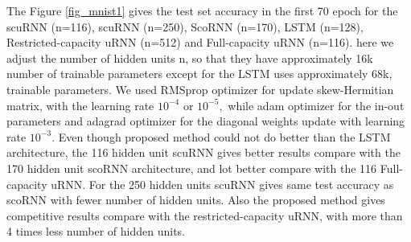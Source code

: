 \documentclass[letterpaper]{article} %
\begin{document}
\noindent The Figure \ref{fig_mnist1} gives the test set accuracy in the first 70 epoch for the scuRNN (n=116), scuRNN (n=250), ScoRNN (n=170), LSTM (n=128), Restricted-capacity uRNN (n=512) and Full-capacity uRNN (n=116). here we adjust the number of hidden units n, so that they have approximately 16k number of trainable parameters except for the LSTM uses approximately 68k, trainable parameters. We used RMSprop optimizer for update skew-Hermitian matrix, with the learning rate $10^{-4}$ or $10^{-5},$ while adam optimizer for the in-out parameters and adagrad optimizer for the diagonal weights update with learning rate $10^{-3}$. Even though proposed method could not do better than the LSTM architecture, the 116 hidden unit scuRNN gives better results compare with the 170 hidden unit scoRNN architecture, and lot better compare with the 116 Full-capacity uRNN. For the 250 hidden units scuRNN gives same test accuracy as scoRNN with fewer number of hidden units. Also the proposed method gives competitive results compare with the restricted-capacity uRNN, with more than 4 times less number of hidden units.
\end{document}
